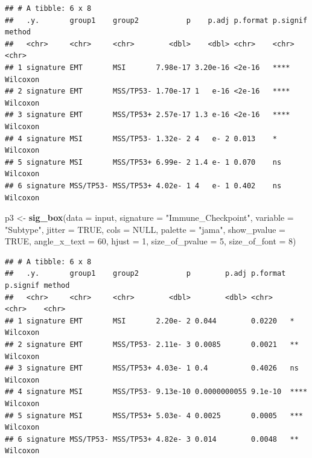 \documentclass[
  12pt,
]{book}
\newenvironment{Shaded}{\begin{snugshade}}{\end{snugshade}}
\newcommand{\AttributeTok}[1]{\textcolor[rgb]{0.13,0.29,0.53}{#1}}
\newcommand{\ConstantTok}[1]{\textcolor[rgb]{0.56,0.35,0.01}{#1}}
\newcommand{\DecValTok}[1]{\textcolor[rgb]{0.00,0.00,0.81}{#1}}
\newcommand{\FunctionTok}[1]{\textcolor[rgb]{0.13,0.29,0.53}{\textbf{#1}}}
\newcommand{\NormalTok}[1]{#1}
\newcommand{\OtherTok}[1]{\textcolor[rgb]{0.56,0.35,0.01}{#1}}
\newcommand{\StringTok}[1]{\textcolor[rgb]{0.31,0.60,0.02}{#1}}
\theoremstyle{definition}
\theoremstyle{definition}
\theoremstyle{definition}
\theoremstyle{definition}
\theoremstyle{remark}
\begin{document}
\begin{verbatim}
## # A tibble: 6 x 8
##   .y.       group1    group2           p    p.adj p.format p.signif method  
##   <chr>     <chr>     <chr>        <dbl>    <dbl> <chr>    <chr>    <chr>   
## 1 signature EMT       MSI       7.98e-17 3.20e-16 <2e-16   ****     Wilcoxon
## 2 signature EMT       MSS/TP53- 1.70e-17 1   e-16 <2e-16   ****     Wilcoxon
## 3 signature EMT       MSS/TP53+ 2.57e-17 1.3 e-16 <2e-16   ****     Wilcoxon
## 4 signature MSI       MSS/TP53- 1.32e- 2 4   e- 2 0.013    *        Wilcoxon
## 5 signature MSI       MSS/TP53+ 6.99e- 2 1.4 e- 1 0.070    ns       Wilcoxon
## 6 signature MSS/TP53- MSS/TP53+ 4.02e- 1 4   e- 1 0.402    ns       Wilcoxon
\end{verbatim}

\begin{Shaded}
\begin{Highlighting}[]
\NormalTok{p3 }\OtherTok{\textless{}{-}} \FunctionTok{sig\_box}\NormalTok{(}\AttributeTok{data           =}\NormalTok{ input, }
              \AttributeTok{signature      =} \StringTok{"Immune\_Checkpoint"}\NormalTok{,}
              \AttributeTok{variable       =} \StringTok{"Subtype"}\NormalTok{,}
              \AttributeTok{jitter          =} \ConstantTok{TRUE}\NormalTok{,}
              \AttributeTok{cols           =} \ConstantTok{NULL}\NormalTok{,}
              \AttributeTok{palette        =} \StringTok{"jama"}\NormalTok{,}
              \AttributeTok{show\_pvalue    =} \ConstantTok{TRUE}\NormalTok{,}
              \AttributeTok{angle\_x\_text   =} \DecValTok{60}\NormalTok{, }
              \AttributeTok{hjust          =} \DecValTok{1}\NormalTok{, }
              \AttributeTok{size\_of\_pvalue =} \DecValTok{5}\NormalTok{, }
              \AttributeTok{size\_of\_font   =} \DecValTok{8}\NormalTok{)}
\end{Highlighting}
\end{Shaded}

\begin{verbatim}
## # A tibble: 6 x 8
##   .y.       group1    group2           p        p.adj p.format p.signif method  
##   <chr>     <chr>     <chr>        <dbl>        <dbl> <chr>    <chr>    <chr>   
## 1 signature EMT       MSI       2.20e- 2 0.044        0.0220   *        Wilcoxon
## 2 signature EMT       MSS/TP53- 2.11e- 3 0.0085       0.0021   **       Wilcoxon
## 3 signature EMT       MSS/TP53+ 4.03e- 1 0.4          0.4026   ns       Wilcoxon
## 4 signature MSI       MSS/TP53- 9.13e-10 0.0000000055 9.1e-10  ****     Wilcoxon
## 5 signature MSI       MSS/TP53+ 5.03e- 4 0.0025       0.0005   ***      Wilcoxon
## 6 signature MSS/TP53- MSS/TP53+ 4.82e- 3 0.014        0.0048   **       Wilcoxon
\end{verbatim}
\end{document}
